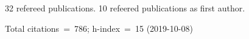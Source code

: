 32 refereed publications. 10 refeered publications as first author.

Total citations~=~786; h-index~=~15 (2019-10-08)